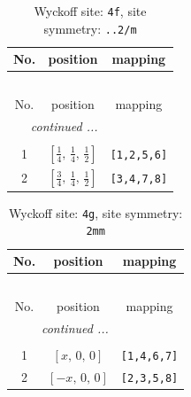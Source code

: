 \documentclass[fleqn,8pt]{jsarticle}
\begin{document}
\renewcommand{\arraystretch}{1.2}
\begin{longtable}{ccc}
\caption{Wyckoff site: {\tt 4f}, site symmetry: {\tt ..2/m}}
 \\
 \hline \hline
No. & position & mapping \\ \hline \endfirsthead

\multicolumn{2}{l}{\tablename\ \thetable{}} \\
 \hline \hline
No. & position & mapping \\ \hline \endhead

 \hline \hline
\multicolumn{2}{r}{\footnotesize\it continued ...} \\ \endfoot

 \hline \hline
\multicolumn{2}{r}{} \\ \endlastfoot

1 & $\left[ \frac{1}{4},\, \frac{1}{4},\, \frac{1}{2} \right]$ & {\tt [1,2,5,6]} \\ \hline
2 & $\left[ \frac{3}{4},\, \frac{1}{4},\, \frac{1}{2} \right]$ & {\tt [3,4,7,8]} \\
\end{longtable}
\renewcommand{\arraystretch}{1.2}
\begin{longtable}{ccc}
\caption{Wyckoff site: {\tt 4g}, site symmetry: {\tt 2mm}}
 \\
 \hline \hline
No. & position & mapping \\ \hline \endfirsthead

\multicolumn{2}{l}{\tablename\ \thetable{}} \\
 \hline \hline
No. & position & mapping \\ \hline \endhead

 \hline \hline
\multicolumn{2}{r}{\footnotesize\it continued ...} \\ \endfoot

 \hline \hline
\multicolumn{2}{r}{} \\ \endlastfoot

1 & $\left[ x,\, 0,\, 0 \right]$ & {\tt [1,4,6,7]} \\ \hline
2 & $\left[ - x,\, 0,\, 0 \right]$ & {\tt [2,3,5,8]} \\
\end{longtable}
\renewcommand{\arraystretch}{1.2}
\end{document}
